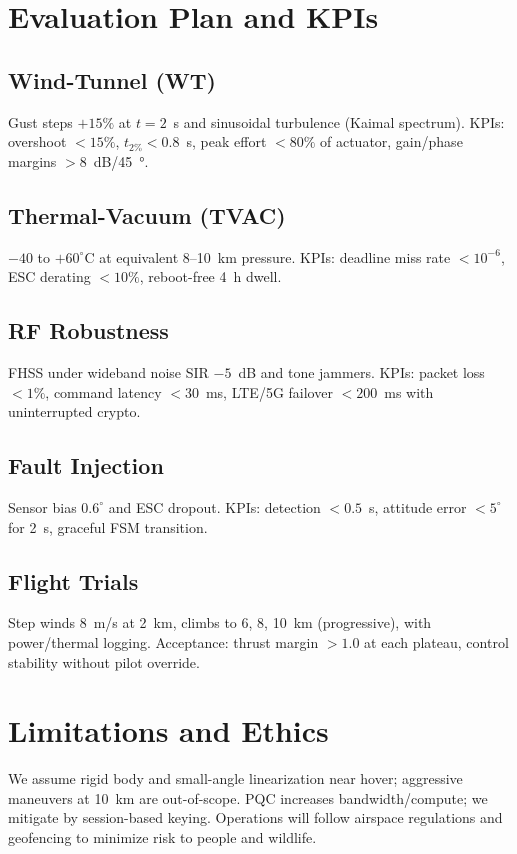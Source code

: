 \documentclass[conference]{IEEEtran}
\begin{document}
\section{Evaluation Plan and KPIs}
\subsection{Wind-Tunnel (WT)}
Gust steps $+15\%$ at $t=2$~s and sinusoidal turbulence (Kaimal spectrum). KPIs: overshoot $<15\%$, $t_{2\%}<0.8$~s, peak effort $<80\%$ of actuator, gain/phase margins $>8$~dB/\SI{45}{\degree}.

\subsection{Thermal-Vacuum (TVAC)}
$-40$ to $+60^\circ$C at equivalent 8--10~km pressure. KPIs: deadline miss rate $<10^{-6}$, ESC derating $<10\%$, reboot-free 4~h dwell.

\subsection{RF Robustness}
FHSS under wideband noise SIR $-5$~dB and tone jammers. KPIs: packet loss $<1\%$, command latency $<30$~ms, LTE/5G failover $<200$~ms with uninterrupted crypto.

\subsection{Fault Injection}
Sensor bias $0.6^\circ$ and ESC dropout. KPIs: detection $<0.5$~s, attitude error $<5^\circ$ for 2~s, graceful FSM transition.

\subsection{Flight Trials}
Step winds \SI{8}{m/s} at 2~km, climbs to 6, 8, 10~km (progressive), with power/thermal logging. Acceptance: thrust margin $>1.0$ at each plateau, control stability without pilot override.

\section{Limitations and Ethics}
We assume rigid body and small-angle linearization near hover; aggressive maneuvers at 10~km are out-of-scope. PQC increases bandwidth/compute; we mitigate by session-based keying. Operations will follow airspace regulations and geofencing to minimize risk to people and wildlife.
\end{document}
